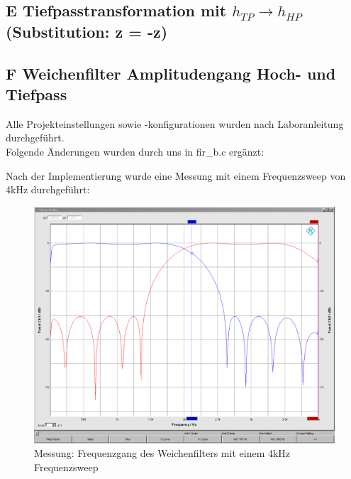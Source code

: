 \clearpage

\subsection{E Tiefpasstransformation mit $h_{TP} \rightarrow h_{HP}$ (Substitution: z = -z)}
\noindent

\clearpage
\subsection{F Weichenfilter Amplitudengang Hoch- und Tiefpass}
\noindent \noindent Alle Projekteinstellungen sowie -konfigurationen wurden nach Laboranleitung durchgeführt. \\
\noindent Folgende Änderungen wurden durch uns in fir\_b.c ergänzt: \\


\clearpage

\noindent Nach der Implementierung wurde eine Messung mit einem Frequenzsweep von 4kHz durchgeführt:

\begin{figure}[h]
	\centering
	\includegraphics[width=1\linewidth]{Bilder/Attachment_F_HPTP}
	\caption{Messung: Frequenzgang des Weichenfilters mit einem 4kHz Frequenzsweep}
	\label{fig:Attachment_F_HPTP}
\end{figure}

